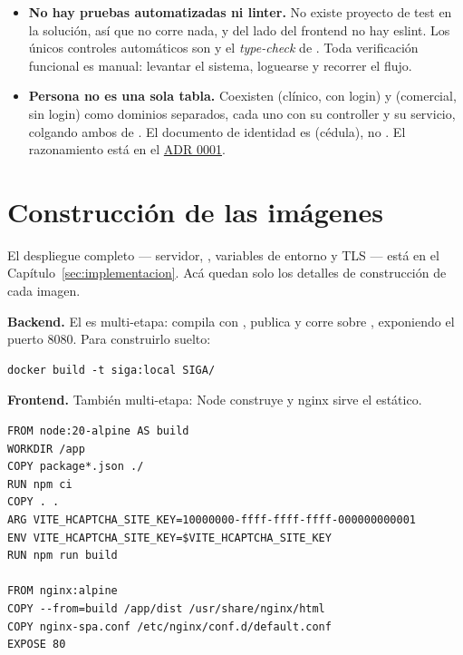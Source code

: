 \begin{itemize}
  \item \textbf{No hay pruebas automatizadas ni linter.} No existe proyecto de test en la solución, así que  no corre nada, y del lado del frontend no hay eslint. Los únicos controles automáticos son  y el \emph{type-check} de . Toda verificación funcional es manual: levantar el sistema, loguearse y recorrer el flujo.
  \item \textbf{Persona no es una sola tabla.} Coexisten  (clínico, con login) y  (comercial, sin login) como dominios separados, cada uno con su controller y su servicio, colgando ambos de . El documento de identidad es  (cédula), no . El razonamiento está en el \hyperref[adr:0001]{ADR 0001}.
\end{itemize}

\section{Construcción de las imágenes}
\label{sec:mt-imagenes}

El despliegue completo --- servidor, \allowbreak {}\allowbreak {}, variables de entorno y TLS --- está en el Capítulo~\ref{sec:implementacion}. Acá quedan solo los detalles de construcción de cada imagen.

\textbf{Backend.} El  es multi-etapa: compila con \allowbreak {}\allowbreak {}\allowbreak {}\allowbreak {}\allowbreak {}, publica  y corre sobre , exponiendo el puerto 8080. Para construirlo suelto:

\begin{lstlisting}[numbers=none]
docker build -t siga:local SIGA/
\end{lstlisting}

\textbf{Frontend.} También multi-etapa: Node construye y nginx sirve el estático.

\begin{lstlisting}[numbers=none]
FROM node:20-alpine AS build
WORKDIR /app
COPY package*.json ./
RUN npm ci
COPY . .
ARG VITE_HCAPTCHA_SITE_KEY=10000000-ffff-ffff-ffff-000000000001
ENV VITE_HCAPTCHA_SITE_KEY=$VITE_HCAPTCHA_SITE_KEY
RUN npm run build

FROM nginx:alpine
COPY --from=build /app/dist /usr/share/nginx/html
COPY nginx-spa.conf /etc/nginx/conf.d/default.conf
EXPOSE 80
\end{lstlisting}

